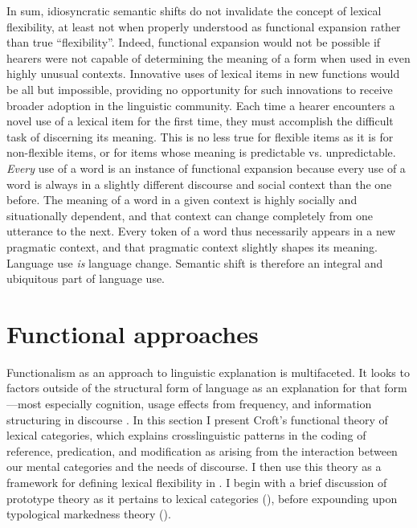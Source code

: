 In sum, idiosyncratic semantic shifts do not invalidate the concept of lexical flexibility, at least not when properly understood as functional expansion rather than true \enquote{flexibility}. Indeed, functional expansion would not be possible if hearers were not capable of determining the meaning of a form when used in even highly unusual contexts. Innovative uses of lexical items in new functions would be all but impossible, providing no opportunity for such innovations to receive broader adoption in the linguistic community. Each time a hearer encounters a novel use of a lexical item for the first time, they must accomplish the difficult task of discerning its meaning. This is no less true for flexible items as it is for non-flexible items, or for items whose meaning is predictable vs. unpredictable. \emph{Every} use of a word is an instance of functional expansion because every use of a word is always in a slightly different discourse and social context than the one before. The meaning of a word in a given context is highly socially and situationally dependent, and that context can change completely from one utterance to the next. Every token of a word thus necessarily appears in a new pragmatic context, and that pragmatic context slightly shapes its meaning. Language use \emph{is} language change. Semantic shift is therefore an integral and ubiquitous part of language use.

\section{Functional approaches}
\label{sec:2.4}

Functionalism as an approach to linguistic explanation is multifaceted. It looks to factors outside of the structural form of language as an explanation for that form—most especially cognition, usage effects from frequency, and information structuring in discourse \parencite[6323--6324]{Croft2001a}. In this section I present Croft's \parencites*{Croft1991}{Croft2000}{Croft2001b} functional theory of lexical categories, which explains crosslinguistic patterns in the coding of reference, predication, and modification as arising from the interaction between our mental categories and the needs of discourse. I then use this theory as a framework for defining lexical flexibility in . I begin with a brief discussion of prototype theory as it pertains to lexical categories (), before expounding upon typological markedness theory ().

